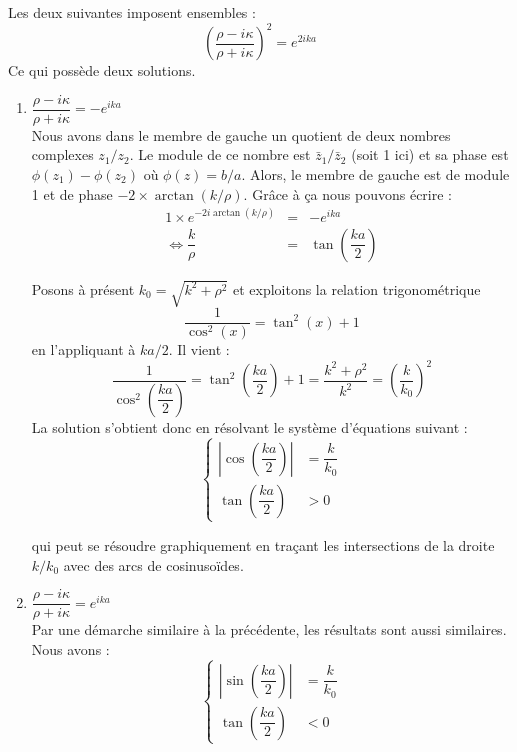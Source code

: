 \documentclass[12pt, a4paper]{book}
\begin{document}
Les deux suivantes imposent ensembles :
\begin{equation}
  \left(\dfrac{\rho - i\kappa}{\rho + i\kappa} \right) ^2 = e ^{2ika}
\end{equation}
Ce qui possède deux solutions.
\begin{enumerate}[label = (\roman*)]
  \item $\dfrac{\rho - i\kappa}{\rho + i\kappa} = -e^{ika}$ \\
      Nous avons dans le membre de gauche un quotient de deux nombres complexes $z_1/z_2$. Le module de ce nombre est $\bar z_1/\bar z_2$ (soit 1 ici) et sa phase est $\phi(z_1) - \phi(z_2)$ où $\phi(z) = b/a$. Alors, le membre de gauche est de module 1 et de phase $-2\times \arctan(k/\rho)$. Grâce à ça nous pouvons écrire :
      \begin{eqnarray*}
        1\times e^{-2i\arctan(k/\rho)} &=& - e^{ika} \\
        \iff \dfrac{k}{\rho} &=& \tan\left(\dfrac{ka}{2}\right)
      \end{eqnarray*}

      Posons à présent $k_0 = \sqrt{k^2 + \rho ^2}$ et exploitons la relation trigonométrique $$\dfrac{1}{\cos ^2(x)} = \tan^2(x) +1$$ en l'appliquant à $ka/2$. Il vient :
      $$\dfrac{1}{\cos ^2\left(\dfrac{ka}{2}\right)} = \tan^2\left(\dfrac{ka}{2}\right) +1  = \dfrac{k^2 + \rho^2}{k^2} = \left(\dfrac{k}{k_0}\right)^2$$
      La solution s'obtient donc en résolvant le système d'équations suivant :
      \begin{equation}
        \left\{ \begin{array}{ll}
          \left| \cos \left(\dfrac{ka}{2}\right)\right| &= \dfrac{k}{k_0} \\
          \tan \left(\dfrac{ka}{2}\right) &>0
        \end{array}\right.
      \end{equation}

      qui peut se résoudre graphiquement en traçant les intersections de la droite $k/k_0$ avec des arcs de cosinusoïdes. \\
  \item $\dfrac{\rho - i\kappa}{\rho + i\kappa} = e^{ika}$ \\
  
  Par une démarche similaire à la précédente, les résultats sont aussi similaires. Nous avons :
  \begin{equation}
    \left\{ \begin{array}{ll}
      \left| \sin \left(\dfrac{ka}{2}\right)\right| &= \dfrac{k}{k_0} \\
      \tan \left(\dfrac{ka}{2}\right) &<0
    \end{array}\right.
  \end{equation}
\end{enumerate}
\end{document}
